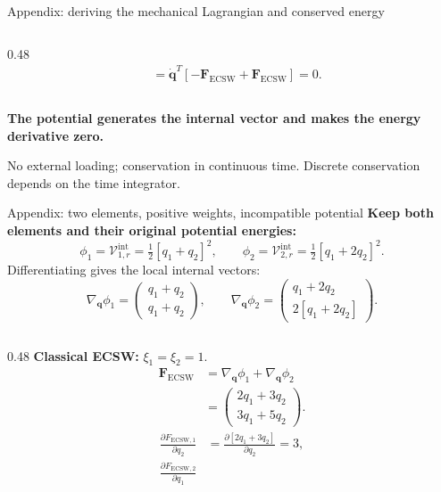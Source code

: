 \documentclass[aspectratio=169]{beamer}
\newcommand{\vect}[1]{\boldsymbol{#1}}
\begin{document}
\begin{frame}{Appendix: deriving the mechanical Lagrangian and conserved energy}
\begin{columns}[T,onlytextwidth]
\begin{column}{0.48\textwidth}
\[\begin{aligned}
  &=\dot{\vect{q}}^T[-\vect{F}_{\mathrm{ECSW}}+\vect{F}_{\mathrm{ECSW}}]=0.
\end{aligned}
\]
\end{column}
\end{columns}
\medskip
\textbf{The potential generates the internal vector and makes the energy derivative zero.}\par
\smallskip
{\fontsize{8}{9}\selectfont No external loading; conservation in continuous time. Discrete conservation depends on the time integrator.}
\vfill
\hfill\hyperlink{bmecsw-euler-lagrange-main}{}
\quad\hyperlink{bmecsw-mechanical-structure}{}
\end{frame}

\begin{frame}{Appendix: two elements, positive weights, incompatible potential}
\hypertarget{bmecsw-structural-example}{}
\fontsize{9}{10.5}\selectfont
\setlength{\parskip}{0pt}
\setlength{\abovedisplayskip}{1.5pt}
\setlength{\belowdisplayskip}{1.5pt}
\textbf{Keep both elements and their original potential energies:}
\[
  \phi_1=\mathcal V_{1,r}^{\mathrm{int}}=\tfrac12[q_1+q_2]^2,
  \qquad \phi_2=\mathcal V_{2,r}^{\mathrm{int}}=\tfrac12[q_1+2q_2]^2.
\]
Differentiating gives the local internal vectors:
\[
  \nabla_{\vect{q}}\phi_1=\begin{pmatrix}q_1+q_2\\q_1+q_2\end{pmatrix},
  \qquad \nabla_{\vect{q}}\phi_2=\begin{pmatrix}q_1+2q_2\\2[q_1+2q_2]\end{pmatrix}.
\]
\begin{columns}[T,onlytextwidth]
\begin{column}{0.48\textwidth}
\textbf{Classical ECSW:} $\xi_1=\xi_2=1$.
\[
\begin{aligned}
  \vect{F}_{\mathrm{ECSW}}
  &=\nabla_{\vect{q}}\phi_1+\nabla_{\vect{q}}\phi_2\\
  &=\begin{pmatrix}2q_1+3q_2\\3q_1+5q_2\end{pmatrix}.
\end{aligned}
\]
\[
\begin{aligned}
  \frac{\partial F_{\mathrm{ECSW},1}}{\partial q_2}
  &=\frac{\partial[2q_1+3q_2]}{\partial q_2}=3,\\
  \frac{\partial F_{\mathrm{ECSW},2}}{\partial q_1}

\end{aligned}\]
\end{column}
\end{columns}
\end{frame}
\end{document}
